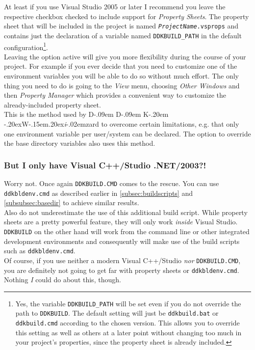 \documentclass[a4paper,titlepage]{report}
\def\ddkwiz{D\kern-.09em D\kern-.09em K\kern-.20em \raise-.20ex\hbox{W}\kern-.15em\raise.20ex\hbox{\it{i}}\kern-.02em{zard}}
\begin{document}
At least if you use Visual Studio 2005 or later I recommend you leave the respective checkbox
checked to include support for \emph{Property Sheets}. The property sheet that will
be included in the project is named \texttt{\emph{ProjectName}.vsprops} and contains
just the declaration of a variable named \texttt{DDKBUILD\_PATH} in the default
configuration\footnote{Yes, the variable \texttt{DDKBUILD\_PATH} will be set even
if you do not override the path to \texttt{DDKBUILD}. The default setting will
just be \texttt{ddkbuild.bat} or \texttt{ddkbuild.cmd} according to the chosen
version. This allows you to override this setting as well as others at a later
point without changing too much in your project's properties, since the property
sheet is already included.}.\\

Leaving the option active will give you more
flexibility during the course of your project. For example if you ever decide
that you need to customize one of the environment variables you will be able
to do so without much effort. The only thing you need to do is going to the
\emph{View} menu, choosing \emph{Other Windows} and then \emph{Property Manager}
which provides a convenient way to customize the already-included property sheet.\\

This is the method used by \ddkwiz{} to overcome certain limitations, e.g.
that only one environment variable per user/system can be declared. The option
to override the base directory variables also uses this method.

\subsubsection{But I only have Visual C++/Studio .NET/2003?!}
Worry not. Once again \texttt{DDKBUILD.CMD} comes to the rescue. You can use \texttt{ddkbldenv.cmd}
as described earlier in \autoref{subsec:buildscripts} and \autoref{subsubsec:basedir} to achieve
similar results.\\
Also do not underestimate the use of this additional build script. While property sheets
are a pretty powerful feature, they will only work \emph{inside} Visual Studio.
\texttt{DDKBUILD} on the other hand will work from the command line or other integrated
development environments and consequently will make use of the build scripts such as
\texttt{ddkbldenv.cmd}.\\

Of course, if you use neither a modern Visual C++/Studio \emph{nor} \texttt{DDKBUILD.CMD}, you are
definitely not going to get far with property sheets or \texttt{ddkbldenv.cmd}. Nothing \emph{I}
could do about this, though.
\end{document}
